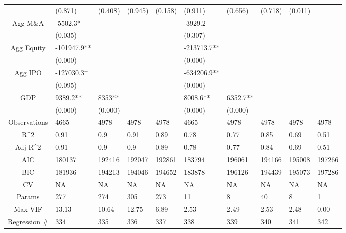 \documentclass{article}
\begin{document}
\begin{table}[H]
\begin{tabular}{|clllllllll|}
   & (0.871) & (0.408) & (0.945) & (0.158) & (0.911) & (0.656) & (0.718) & (0.011) &  \\ 
  Agg M\&A & -5502.3* &  &  &  & -3929.2 &  &  &  &  \\ 
   & (0.035) &  &  &  & (0.307) &  &  &  &  \\ 
  Agg Equity & -101947.9** &  &  &  & -213713.7** &  &  &  &  \\ 
   & (0.000) &  &  &  & (0.000) &  &  &  &  \\ 
  Agg IPO & -127030.3$^{+}$ &  &  &  & -634206.9** &  &  &  &  \\ 
   & (0.095) &  &  &  & (0.000) &  &  &  &  \\ 
  GDP & 9389.2** & 8353** &  &  & 8008.6** & 6352.7** &  &  &  \\ 
   & (0.000) & (0.000) &  &  & (0.000) & (0.000) &  &  &  \\ 
  \hline 
 Observations & 4665 & 4978 & 4978 & 4978 & 4665 & 4978 & 4978 & 4978 & 4978 \\ 
  R^2 & 0.91 & 0.9 & 0.91 & 0.89 & 0.78 & 0.77 & 0.85 & 0.69 & 0.51 \\ 
  Adj R^2 & 0.91 & 0.9 & 0.9 & 0.89 & 0.78 & 0.77 & 0.84 & 0.69 & 0.51 \\ 
  AIC & 180137 & 192416 & 192047 & 192861 & 183794 & 196061 & 194166 & 195008 & 197266 \\ 
  BIC & 181936 & 194213 & 194046 & 194652 & 183878 & 196126 & 194439 & 195073 & 197286 \\ 
  CV & NA & NA & NA & NA & NA & NA & NA & NA & NA \\ 
  Params & 277 & 274 & 305 & 273 & 11 & 8 & 40 & 8 & 1 \\ 
  Max VIF & 13.13 & 10.64 & 12.75 & 6.89 & 2.53 & 2.49 & 2.53 & 2.48 & 0.00 \\ 
  Regression \# & 334 & 335 & 336 & 337 & 338 & 339 & 340 & 341 & 342 \\ 
   \hline
\end{tabular}
 
\end{table}
\end{document}
